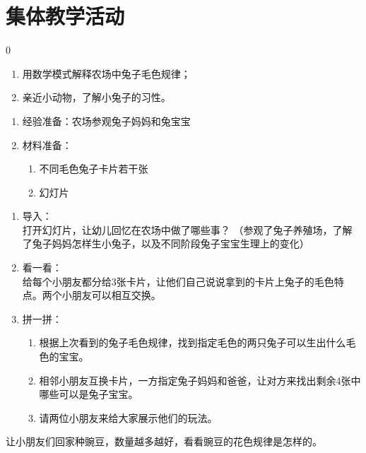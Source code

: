 \documentclass[a4paper, 12pt, oneside]{article}
\begin{document}
\section{集体教学活动}
    \begin{tcolorbox}[colback=yellow!10!white,colframe=cyan!75!black,title=活动名称：]
        0
    \end{tcolorbox}
    \begin{tcolorbox}[colback=yellow!10!white,colframe=cyan!75!black,title=活动目标：]
        \begin{enumerate}
            \item 用数学模式解释农场中兔子毛色规律；
            \item 亲近小动物，了解小兔子的习性。
        \end{enumerate}
    \end{tcolorbox}
    \begin{tcolorbox}[colback=yellow!10!white,colframe=cyan!75!black,title=活动准备：]
        \begin{enumerate}
            \item 经验准备：农场参观兔子妈妈和兔宝宝
            \item 材料准备：
            \begin{enumerate}[1)]
                \item 不同毛色兔子卡片若干张
                \item 幻灯片
            \end{enumerate}
        \end{enumerate}
    \end{tcolorbox}
    \begin{tcolorbox}[colback=yellow!10!white,colframe=cyan!75!black,title=活动过程：]
        \begin{enumerate}
            \item 导入：\\
            打开幻灯片，让幼儿回忆在农场中做了哪些事？
            （参观了兔子养殖场，了解了兔子妈妈怎样生小兔子，以及不同阶段兔子宝宝生理上的变化）
            \item 看一看：\\
            给每个小朋友都分给3张卡片，让他们自己说说拿到的卡片上兔子的毛色特点。两个小朋友可以相互交换。
            \item 拼一拼：
            \begin{enumerate}[1)]
                \item 根据上次看到的兔子毛色规律，找到指定毛色的两只兔子可以生出什么毛色的宝宝。
                \item 相邻小朋友互换卡片，一方指定兔子妈妈和爸爸，让对方来找出剩余4张中哪些可以是兔子宝宝。
                \item 请两位小朋友来给大家展示他们的玩法。
            \end{enumerate}
        \end{enumerate}
    \end{tcolorbox}
    \begin{tcolorbox}[colback=yellow!10!white,colframe=cyan!75!black,title=活动延伸：]
        让小朋友们回家种豌豆，数量越多越好，看看豌豆的花色规律是怎样的。
    \end{tcolorbox}
\end{document}
